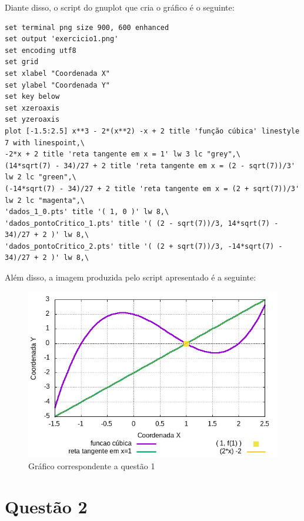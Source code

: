 \documentclass[acmlarge,screen]{acmart}
\begin{document}
Diante disso, o script do gnuplot que cria o gráfico é o seguinte:

\begin{lstlisting}[htb]
set terminal png size 900, 600 enhanced
set output 'exercicio1.png'
set encoding utf8
set grid
set xlabel "Coordenada X"
set ylabel "Coordenada Y"
set key below
set xzeroaxis
set yzeroaxis
plot [-1.5:2.5] x**3 - 2*(x**2) -x + 2 title 'função cúbica' linestyle 7 with linespoint,\
-2*x + 2 title 'reta tangente em x = 1' lw 3 lc "grey",\
(14*sqrt(7) - 34)/27 + 2 title 'reta tangente em x = (2 - sqrt(7))/3' lw 2 lc "green",\
(-14*sqrt(7) - 34)/27 + 2 title 'reta tangente em x = (2 + sqrt(7))/3' lw 2 lc "magenta",\
'dados_1_0.pts' title '( 1, 0 )' lw 8,\
'dados_pontoCritico_1.pts' title '( (2 - sqrt(7))/3, 14*sqrt(7) - 34)/27 + 2 )' lw 8,\
'dados_pontoCritico_2.pts' title '( (2 + sqrt(7))/3, -14*sqrt(7) - 34)/27 + 2 )' lw 8,\
\end{lstlisting}
 
 Além disso, a imagem produzida pelo script apresentado é a seguinte:
 
\begin{figure}[htb]
    \centering
    \includegraphics[scale=0.5]{exercicio1.png}
    \caption{Gráfico correspondente a questão 1}
    \label{fig:my_label}
\end{figure}

\section{Questão 2}
\end{document}
